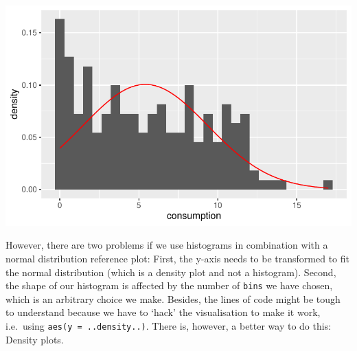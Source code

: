 \documentclass[
  letterpaper,
  DIV=11,
  numbers=noendperiod]{scrreprt}
\newenvironment{Shaded}{\begin{snugshade}}{\end{snugshade}}
\newcommand{\AttributeTok}[1]{\textcolor[rgb]{0.40,0.45,0.13}{#1}}
\newcommand{\CommentTok}[1]{\textcolor[rgb]{0.37,0.37,0.37}{#1}}
\newcommand{\DecValTok}[1]{\textcolor[rgb]{0.68,0.00,0.00}{#1}}
\newcommand{\FunctionTok}[1]{\textcolor[rgb]{0.28,0.35,0.67}{#1}}
\newcommand{\NormalTok}[1]{\textcolor[rgb]{0.00,0.23,0.31}{#1}}
\newcommand{\SpecialCharTok}[1]{\textcolor[rgb]{0.37,0.37,0.37}{#1}}
\newcommand{\StringTok}[1]{\textcolor[rgb]{0.13,0.47,0.30}{#1}}
\begin{document}
\begin{Shaded}
\end{Shaded}

\includegraphics{08_descriptive_statistics_files/figure-latex/compare-normal-distribution-to-our-data-1.pdf}

However, there are two problems if we use histograms in combination with
a normal distribution reference plot: First, the y-axis needs to be
transformed to fit the normal distribution (which is a density plot and
not a histogram). Second, the shape of our histogram is affected by the
number of \texttt{bins} we have chosen, which is an arbitrary choice we
make. Besides, the lines of code might be tough to understand because we
have to `hack' the visualisation to make it work, i.e.~using
\texttt{aes(y\ =\ ..density..)}. There is, however, a better way to do
this: Density plots.
\end{document}
